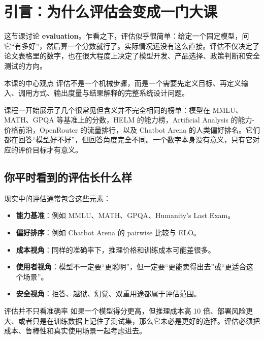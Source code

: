 \section{引言：为什么评估会变成一门大课}

这节课讨论 \textbf{evaluation}。乍看之下，评估似乎很简单：给定一个固定模型，问它``有多好''，然后算一个分数就行了。实际情况远没有这么直接。评估不仅决定了论文表格里的数字，也在很大程度上决定了模型开发、产品选择、政策判断和安全测试的方向。

\begin{importantbox}{本课的中心观点}
评估不是一个机械步骤，而是一个需要先定义目标、再定义输入、调用方式、输出度量与结果解释的完整系统设计问题。
\end{importantbox}

课程一开始展示了几个很常见但含义并不完全相同的榜单：模型在 MMLU、MATH、GPQA 等基准上的分数，HELM 的能力榜，Artificial Analysis 的能力-价格前沿，OpenRouter 的流量排行，以及 Chatbot Arena 的人类偏好排名。它们都在回答``模型好不好''，但回答角度完全不同。一个数字本身没有意义，只有它对应的评价目标才有意义。

\subsection{你平时看到的评估长什么样}

现实中的评估通常包含这些元素：

\begin{itemize}
    \item \textbf{能力基准}：例如 MMLU、MATH、GPQA、Humanity's Last Exam。
    \item \textbf{偏好排序}：例如 Chatbot Arena 的 pairwise 比较与 ELO。
    \item \textbf{成本视角}：同样的准确率下，推理价格和训练成本可能差很多。
    \item \textbf{使用者视角}：模型不一定要``更聪明''，但一定要``更能卖得出去''或``更适合这个场景''。
    \item \textbf{安全视角}：拒答、越狱、幻觉、双重用途都属于评估范围。
\end{itemize}

\begin{knowledgebox}{评估并不只看准确率}
如果一个模型得分更高，但推理成本高 10 倍、部署风险更大、或者只是在训练数据上记住了测试集，那么它未必是更好的选择。评估必须把成本、鲁棒性和真实使用场景一起考虑进去。
\end{knowledgebox}

